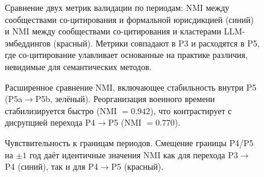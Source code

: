 \documentclass[11pt]{article}
\begin{document}
\begin{figure}[ht]
\centering

\caption{Сравнение двух метрик валидации по периодам: NMI между сообществами со-цитирования и формальной юрисдикцией (синий) и NMI между сообществами со-цитирования и кластерами LLM-эмбеддингов (красный). Метрики совпадают в P3 и расходятся в P5, где со-цитирование улавливает основанные на практике различия, невидимые для семантических методов.}
\label{fig:embed_comparison}
\end{figure}

\begin{figure}[ht]
\centering

\caption{Расширенное сравнение NMI, включающее стабильность внутри P5 (P5a$\to$P5b, зелёный). Реорганизация военного времени стабилизируется быстро (NMI $= 0.942$), что контрастирует с дисрупцией перехода P4$\to$P5 (NMI $= 0.770$).}
\label{fig:nmi_extended}
\end{figure}

\begin{figure}[ht]
\centering

\caption{Чувствительность к границам периодов. Смещение границы P4/P5 на $\pm 1$ год даёт идентичные значения NMI как для перехода P3$\to$P4 (синий), так и для P4$\to$P5 (красный).}
\label{fig:boundary}
\end{figure}




\end{document}
